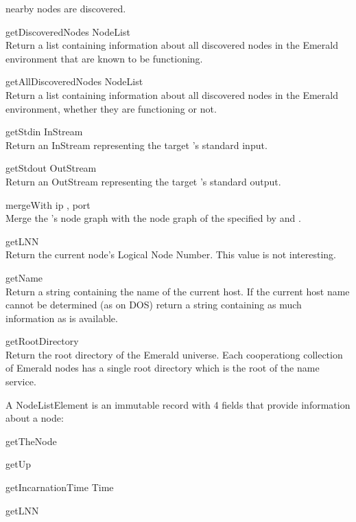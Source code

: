 \begin{desc}
    nearby nodes are discovered.
  \item[\kw{operation} getDiscoveredNodes \returns{} \/\LB{}NodeList\/\RB{}]~\\
    Return a list containing information about all discovered nodes in the Emerald
    environment that are known to be functioning.
  \item[\kw{operation} getAllDiscoveredNodes \returns{} \/\LB{}NodeList\/\RB{}]~\\
    Return a list containing information about all discovered nodes in the Emerald
    environment, whether they are functioning or not.
  \item[\kw{operation} getStdin \returns{} \/\LB{}InStream\/\RB{}]~\\
    Return an InStream representing the target 's standard input.
  \item[\kw{operation} getStdout \returns{} \/\LB{}OutStream\/\RB{}]~\\
    Return an OutStream representing the target 's standard output.
  \item[\kw{operation} mergeWith \/\LB{}ip \CO{} \tn{String}, port \CO{} \tn{Integer}\/\RB{}]~\\
    Merge the 's node graph with the node graph of the  specified
    by  and .
  \item[\kw{function} getLNN \returns{} \/\LB{}\tn{Integer}\/\RB{}]~\\
    Return the current node's Logical Node Number.  This value is not
    interesting.
  \item[\kw{function} getName \returns{} \/\LB{}\tn{String}\/\RB{}]~\\
    Return a string containing the name of the current host.  If the current
    host name cannot be determined (as on DOS) return a string containing as
    much information as is available.
  \item[\kw{function} getRootDirectory \returns{} \/\LB{}\tn{Directory}\/\RB{}]~\\
    Return the root directory of the Emerald universe.  Each cooperationg
    collection of Emerald nodes has a single root directory which is the
    root of the name service.
\end{desc}

\noindent A NodeListElement is an immutable record with 4 fields that
provide information about a node:

\begin{desc}
  \item[\kw{function} getTheNode \returns{} \/\LB{}\tn{Node}\/\RB{}]
  \item[\kw{function} getUp \returns{} \/\LB{}\tn{Boolean}\/\RB{}]
  \item[\kw{function} getIncarnationTime \returns{} \/\LB{}Time\/\RB{}]
  \item[\kw{function} getLNN \returns{} \/\LB{}\tn{Integer}\/\RB{}]
\end{desc}

